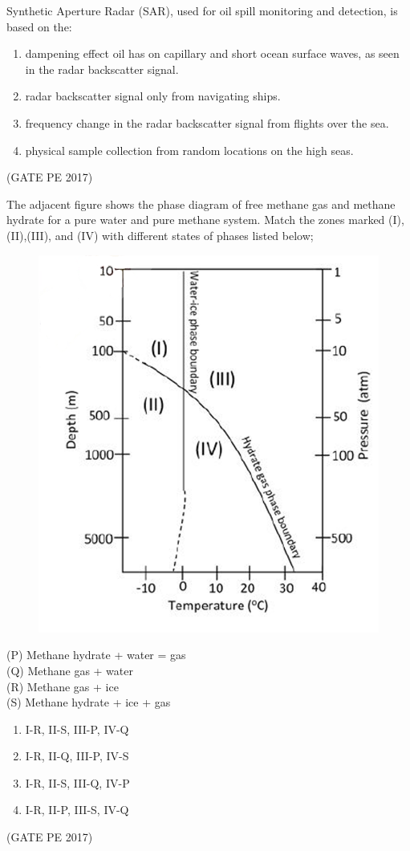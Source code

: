 \documentclass[journal,12pt,onecolumn]{IEEEtran}
\theoremstyle{remark}
\begin{document}
\begin{enumerate}
{\item Synthetic Aperture Radar (SAR), used for oil spill monitoring and detection, is based on the:\\
\begin{enumerate}
\item dampening effect oil has on capillary and short ocean surface waves, as seen in the radar backscatter signal.
\item radar backscatter signal only from navigating ships.
\item frequency change in the radar backscatter signal from flights over the sea.
\item physical sample collection from random locations on the high seas.
\end{enumerate}
\hfill{(GATE PE 2017)}

\item The adjacent figure shows the phase diagram of free methane gas and methane hydrate for a pure water and pure methane system. Match the zones marked (I),(II),(III), and (IV) with different states of phases listed below;

\begin{figure}[h]
    \centering
    \includegraphics[width=0.5\columnwidth]{Graph_Q55.png}
    \caption{}
    \label{fig:placeholder}
\end{figure}
(P) Methane hydrate + water = gas\\
(Q) Methane gas + water\\
(R) Methane gas + ice\\
(S) Methane hydrate + ice + gas\\

\begin{enumerate}
    \item I-R, II-S, III-P, IV-Q
    \item I-R, II-Q, III-P, IV-S
    \item I-R, II-S, III-Q, IV-P
    \item I-R, II-P, III-S, IV-Q
\end{enumerate}
\hfill{(GATE PE 2017)}

}
\end{enumerate}
\end{document}
